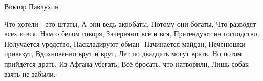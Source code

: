  
 
 
 
 

Виктор Павлухин

Что хотели - это штаты,
А они ведь акробаты,
Потому они богаты,
Что разводят всех и вся,
Нам о белом говоря,
Зачерняют всё и вся,
Претендуют на господство,
Получается уродство,
Наскладируют обман-
Начинается майдан,
Печенюшки привезут,
Вдохновенно врут и врут,
Лет по двадцать могут врать,
Но потом прийдётся драть,
Из Афгана убегать,
Всё бросать, что натворили,
Лишь собак взять не забыли.
